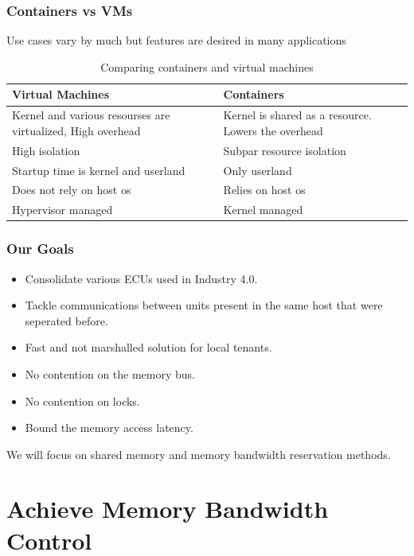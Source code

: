 \documentclass{beamer}
\begin{document}
\begin{frame}
    \frametitle{Containers vs VMs}
    Use cases vary by much but features are desired in many applications \\
    \begin{table}[ht]
        \centering
        \begin{tabular}{|p{}|p{}|} \hline
            Virtual Machines & Containers \\ \hline
            Kernel and various resourses are virtualized, High overhead
            & Kernel is shared as a resource. Lowers the overhead \\ \hline
            High isolation & Subpar resource isolation \\ \hline
            Startup time is kernel and userland & Only userland \\ \hline
            Does not rely on host os & Relies on host os \\ \hline
            Hypervisor managed & Kernel managed \\ \hline
        \end{tabular}
        \caption{Comparing containers and virtual machines}
    \end{table}
\end{frame}

\begin{frame}
    \frametitle{Our Goals}
    \begin{itemize}
        \item Consolidate various ECUs used in Industry 4.0.
        \item Tackle communications between units present in the same
            host that were seperated before.
        \item Fast and not marshalled solution for local tenants.
        \item No contention on the memory bus.
        \item No contention on locks.
        \item Bound the memory access latency.
    \end{itemize}
    We will focus on shared memory and memory bandwidth reservation methods.
\end{frame}

\section{Achieve Memory Bandwidth Control}
\end{document}

